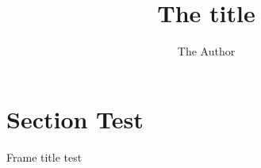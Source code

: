 \documentclass{beamer}
\title{The title}
\author{The Author}
\begin{document}
\section{Section Test}
\begin{frame}{Frame title}
test
\end{frame}
\end{document}
